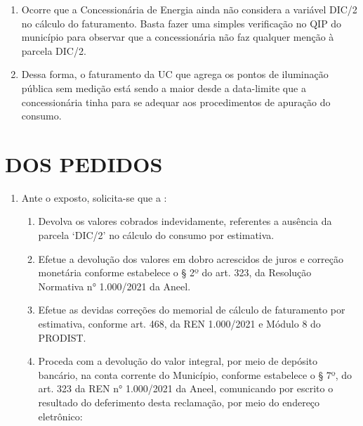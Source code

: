 \begin{enumerate}[resume]
{    [...]

    II - 7 de julho de 2021 para adequação ao §4º do art. 21-A, §4º do art. 21-E, §1º do art. 22, inciso IV do art. 24 e §7º do art. 24-A; (grifou-se)
}

\item Ocorre que a Concessionária de Energia ainda não considera a variável DIC/2 no cálculo do faturamento. Basta fazer uma simples verificação no QIP do município para observar que a concessionária não faz qualquer menção à parcela DIC/2.

\item Dessa forma, o faturamento da UC que agrega os pontos de iluminação pública sem medição está sendo a maior desde a data-limite que a concessionária tinha para se adequar aos procedimentos de apuração do consumo.

\end{enumerate}

\section{DOS PEDIDOS}

\begin{enumerate}[resume]
\item Ante o exposto, solicita-se que a \nomeConcessionaria{}: 
    \begin{enumerate}
        \item Devolva os valores cobrados indevidamente, referentes a ausência da parcela ‘DIC/2’ no cálculo do consumo por estimativa.
        \item Efetue a devolução dos valores em dobro acrescidos de juros e correção monetária conforme estabelece o § 2º do art. 323, da Resolução Normativa n° 1.000/2021 da Aneel.
        \item Efetue as devidas correções do memorial de cálculo de faturamento por estimativa, conforme art. 468, da REN 1.000/2021 e Módulo 8 do PRODIST.
        \item Proceda com a devolução do valor integral, por meio de depósito bancário, na conta corrente do Município, conforme estabelece o § 7º, do art. 323 da REN n° 1.000/2021 da Aneel, comunicando por escrito o resultado do deferimento desta reclamação, por meio do endereço eletrônico: \emailEmpresa{}
    \end{enumerate}
\end{enumerate}